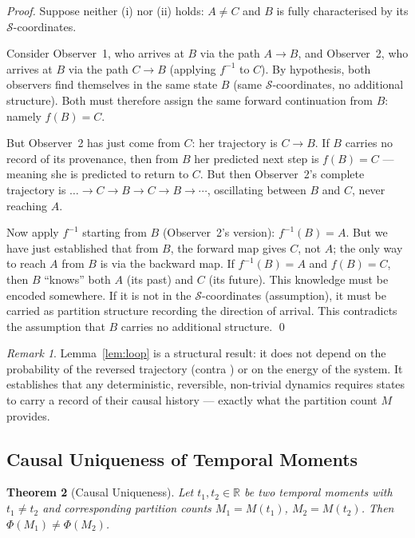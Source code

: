 \documentclass[twocolumn,10pt,a4paper]{article}
\theoremstyle{thmstyle}
\newtheorem{theorem}{Theorem}[section]
\theoremstyle{definition}
\theoremstyle{remark}
\newtheorem{remark}[theorem]{Remark}
\newcommand{\R}{\mathbb{R}}
\newcommand{\StateSpace}{\mathcal{S}}
\newcommand{\PhiMap}{\varPhi}
\begin{document}
\begin{proof}
Suppose neither (i) nor (ii) holds: $A \neq C$ and $B$ is fully characterised by its $\StateSpace$-coordinates.

Consider Observer~1, who arrives at $B$ via the path $A \to B$, and Observer~2, who arrives at $B$ via the path $C \to B$ (applying $f^{-1}$ to $C$). By hypothesis, both observers find themselves in the same state $B$ (same $\StateSpace$-coordinates, no additional structure). Both must therefore assign the same forward continuation from $B$: namely $f(B) = C$.

But Observer~2 has just come from $C$: her trajectory is $C \to B$. If $B$ carries no record of its provenance, then from $B$ her predicted next step is $f(B) = C$ --- meaning she is predicted to return to $C$. But then Observer~2's complete trajectory is $\ldots \to C \to B \to C \to B \to \cdots$, oscillating between $B$ and $C$, never reaching $A$.

Now apply $f^{-1}$ starting from $B$ (Observer~2's version): $f^{-1}(B) = A$. But we have just established that from $B$, the forward map gives $C$, not $A$; the only way to reach $A$ from $B$ is via the backward map. If $f^{-1}(B) = A$ and $f(B) = C$, then $B$ ``knows'' both $A$ (its past) and $C$ (its future). This knowledge must be encoded somewhere. If it is not in the $\StateSpace$-coordinates (assumption), it must be carried as partition structure recording the direction of arrival. This contradicts the assumption that $B$ carries no additional structure. \qed
\end{proof}

\begin{remark}
Lemma~\ref{lem:loop} is a structural result: it does not depend on the probability of the reversed trajectory (contra \citealt{boltzmann1877}) or on the energy of the system. It establishes that any deterministic, reversible, non-trivial dynamics requires states to carry a record of their causal history --- exactly what the partition count $M$ provides.
\end{remark}

\subsection{Causal Uniqueness of Temporal Moments}

\begin{theorem}[Causal Uniqueness]
\label{thm:causal-unique}
Let $t_1, t_2 \in \R$ be two temporal moments with $t_1 \neq t_2$ and corresponding partition counts $M_1 = M(t_1)$, $M_2 = M(t_2)$. Then $\PhiMap(M_1) \neq \PhiMap(M_2)$.
\end{theorem}
\end{document}
